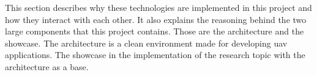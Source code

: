 This section describes why these technologies are implemented in this project and how they interact with each other. It also explains the reasoning behind the two large components that this project contains. Those are the architecture and the showcase. The architecture is a clean environment made for developing \acs{uav} applications. The showcase in the implementation of the research topic with the architecture as a base.